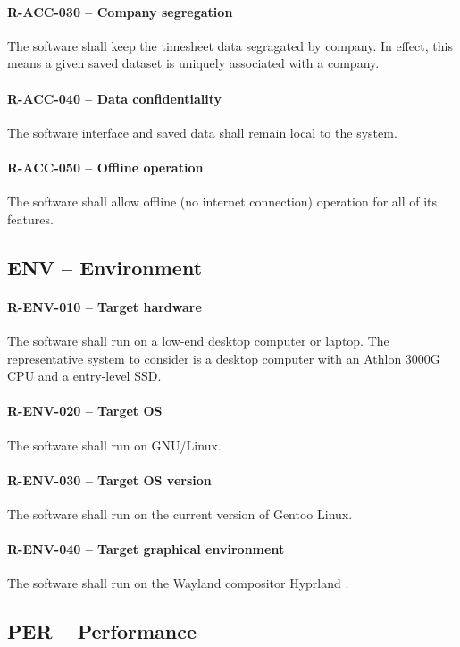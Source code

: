 \paragraph{R-ACC-030 -- Company segregation}
The software shall keep the timesheet data segragated by company.
In effect, this means a given saved dataset is uniquely associated with a
company.

\paragraph{R-ACC-040 -- Data confidentiality}
The software interface and saved data shall remain local to the system.

\paragraph{R-ACC-050 -- Offline operation}
The software shall allow offline (no internet connection) operation for all of
its features.

\subsection{ENV -- Environment}
\paragraph{R-ENV-010 -- Target hardware}
The software shall run on a low-end desktop computer or laptop.
The representative system to consider is a desktop computer with
an Athlon 3000G CPU and a entry-level SSD.

\paragraph{R-ENV-020 -- Target OS}
The software shall run on GNU/Linux.

\paragraph{R-ENV-030 -- Target OS version}
The software shall run on the current version of Gentoo Linux.

\paragraph{R-ENV-040 -- Target graphical environment}
The software shall run on the Wayland compositor Hyprland \cite{hyprland}.

\subsection{PER -- Performance}
